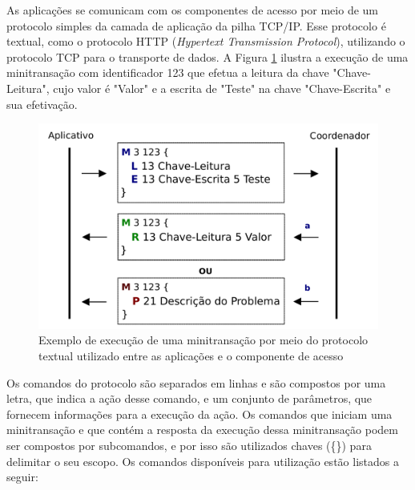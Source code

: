 \documentclass[11pt,twoside,a4paper]{book}
\begin{document}
As aplicações se comunicam com os componentes de acesso por meio de um protocolo simples da camada de aplicação da pilha TCP/IP. Esse protocolo é textual, como o protocolo HTTP (\emph{Hypertext Transmission Protocol}), utilizando o protocolo TCP para o transporte de dados. A Figura \ref{fig:protocolo} ilustra a execução de uma minitransação com identificador 123 que efetua a leitura da chave "Chave-Leitura", cujo valor é "Valor" e a escrita de "Teste" na chave "Chave-Escrita" e sua efetivação.

\begin{figure}
  \centering
  \includegraphics[width=.80\textwidth]{protocolo} 
  \caption{Exemplo de execução de uma minitransação por meio do protocolo textual utilizado entre as aplicações e o componente de acesso}
  \label{fig:protocolo} 
\end{figure}

Os comandos do protocolo são separados em linhas e são compostos por uma letra, que indica a ação desse comando, e um conjunto de parâmetros, que fornecem informações para a execução da ação. Os comandos que iniciam uma minitransação e que contém a resposta da execução dessa minitransação podem ser compostos por subcomandos, e por isso são utilizados chaves (\{\}) para delimitar o seu escopo. Os comandos disponíveis para utilização estão listados a seguir:
\end{document}
